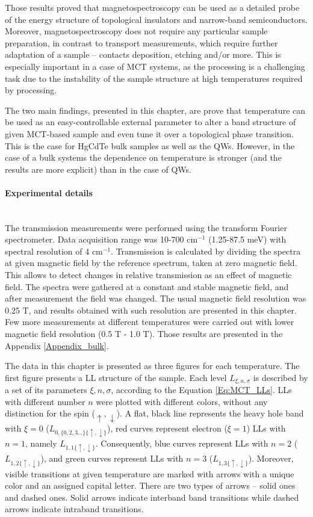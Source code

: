 \documentclass[titlepage,a4paper]{book}
\newcommand{\wciecie}{\quad\phantom{v}}
\newcommand{\myparagraph}[1]{\paragraph{#1}\mbox{}\\}
\begin{document}
Those results proved that magnetospectroscopy can be used as a detailed probe of the energy structure of topological insulators and narrow-band semiconductors. Moreover, magnetospectroscopy does not require any particular sample preparation, in contrast to transport measurements, which require further adaptation of a sample -- contacts deposition, etching and/or more. This is especially important in a case of MCT systems, as the processing is a challenging task due to the instability of the sample structure at high temperatures required by processing.

The two main findings, presented in this chapter, are prove that temperature can be used as an easy-controllable external parameter to alter a band structure of given MCT-based sample and even tune it over a topological phase transition. This is the case for HgCdTe bulk samples as well as the QWs. However, in the case of a bulk systems the dependence on temperature is stronger (and the results are more explicit) than in the case of QWs. 

\myparagraph{Experimental details}
\wciecie
The transmission measurements were performed using the transform Fourier spectrometer. Data acquisition range was 10-700 cm$^{-1}$ (1.25-87.5 meV) with spectral resolution of 4 cm$^{-1}$. Transmission is calculated by dividing the spectra at given magnetic field by the reference spectrum, taken at zero magnetic field. This allows to detect changes in relative transmission as an effect of magnetic field. The spectra were gathered at a constant and stable magnetic field, and after measurement the field was changed. The usual magnetic field resolution was 0.25 T, and results obtained with such resolution are presented in this chapter. Few more measurements at different temperatures were carried out with lower magnetic field resolution (0.5 T - 1.0 T). Those results are presented in the Appendix \ref{Appendix_bulk}.

The data in this chapter is presented as three figures for each temperature. The first figure presents a LL structure of the sample. Each level $L_{\xi,n,\sigma}$ is described by a set of its parameters $\xi,n,\sigma$, according to the Equation \ref{Eq:MCT_LLs}. LLs with different number $n$ were plotted with different colors, without any distinction for the spin ($\uparrow,\downarrow$). A flat, black line represents the heavy hole band with $\xi = 0$ ($L_{0,\{0,2,3...\}\{\uparrow,\downarrow\}}$), red curves represent electron ($\xi = 1$) LLs with $n = 1$, namely $L_{1,1\{\uparrow,\downarrow\}}$. Consequently, blue curves represent LLs with $n = 2$ ($L_{1,2\{\uparrow,\downarrow\}}$), and green curves represent LLs with $n = 3$ ($L_{1,3\{\uparrow,\downarrow\}}$). Moreover, visible transitions at given temperature are marked with arrows with a unique color and an assigned capital letter. There are two types of arrows -- solid ones and dashed ones. Solid arrows indicate interband band transitions while dashed arrows indicate intraband transitions. 
\end{document}
